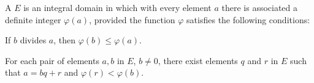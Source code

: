 A  $E$ is an integral domain in which with every element $a$ there is associated a definite integer $\varphi(a)$, provided the function $\varphi$ satisfies the following conditions:

 If $b$ divides $a$, then $\varphi(b) \leq \varphi(a)$.

 For each pair of elements $a, b$ in $E$, $b \neq 0$, there exist elements $q$ and $r$ in $E$ such that $a = bq + r$ and $\varphi(r) < \varphi(b)$.
